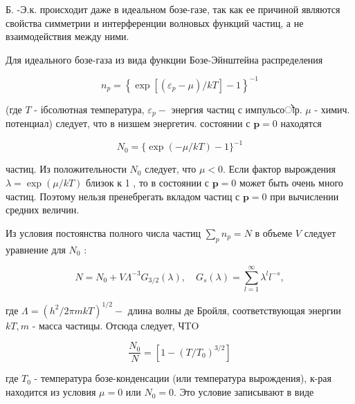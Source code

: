 \documentclass[10pt]{article}
\begin{document}
Б. -Э.к. происходит даже в идеальном бозе-газе, так как ее причиной являются свойства симметрии и интерференции волновых функций частиц, а не взаимодействия между ними.



Для идеального бозе-газа из вида функции Бозе-Эйнштейна распределения



\[

n_{p}=\left\{\exp \left[\left(\varepsilon_{p}-\mu\right) / k T\right]-1\right\}^{-1}

\]



(где $T$ - ібсолютная температура, $\varepsilon_{p}-$ энергия частиц с импульсоोр. $\mu$ - химич. потенциал) следует, что в низшем энергетич. состоянии с $\boldsymbol{p}=0$ находятся



\[

N_{0}=\{\exp (-\mu / k T)-1\}^{-1}

\]



частиц. Из положительности $N_{0}$ следует, что $\mu<0$. Если фактор вырождения $\lambda=\exp (\mu / k T)$ близок к 1 , то в состоянии с $\boldsymbol{p}=0$ может быть очень много частиц. Поэтому нельзя пренебрегать вкладом частиц с $\boldsymbol{p}=0$ при вычислении средних величин.



Из условия постоянства полного числа частиц $\sum_{p} n_{p}=N$ в объеме $V$ следует уравнение для $N_{0}$ :



\[

N=N_{0}+V \Lambda^{-3} G_{3 / 2}(\lambda), \quad G_{s}(\lambda)=\sum_{l=1}^{\infty} \lambda^{l} l^{-s},

\]



где $\Lambda=\left(h^{2} / 2 \pi m k T\right)^{1 / 2}-$ длина волны де Бройля, соответствующая энергии $k T, m$ - масса частицы. Отсюда следует, ЧTO



\[

\frac{N_{0}}{N}=\left[1-\left(T / T_{0}\right)^{3 / 2}\right]

\]



где $T_{0}$ - температура бозе-конденсации (или температура вырождения), к-рая находится из условия $\mu=0$ или $N_{0}=0$. Это условие записывают в виде
\end{document}
